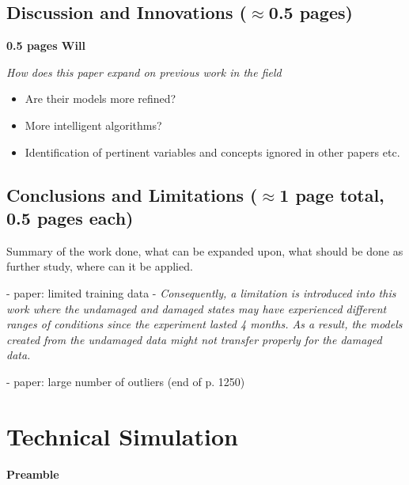 \documentclass{article}
\begin{document}
\subsection{Discussion and Innovations ($\approx$0.5 pages)}
\textbf{0.5 pages Will}

\textit{How does this paper expand on previous work in the field}
\begin{itemize}
    \item Are their models more refined?
    \item More intelligent algorithms?
    \item Identification of pertinent variables and concepts ignored in other papers etc.
\end{itemize}


\subsection{Conclusions and Limitations ($\approx$1 page total, 0.5 pages each)}
Summary of the work done, what can be expanded upon, what should be done as further study, where can it be applied. 

- paper: limited training data - \textit{Consequently, a limitation is introduced into this work where the undamaged and damaged states may have experienced different ranges of conditions since the experiment lasted 4 months. As a result, the models created from the undamaged data might not transfer properly for the damaged data.} \cite{paper_ref20}

- paper: large number of outliers (end of p. 1250)

\pagebreak

\section{Technical Simulation}

\renewcommand{\thesubsection}{Q.\arabic{subsection}}

\large\textbf{Preamble}\medskip\\
\label{preamble}
\end{document}

